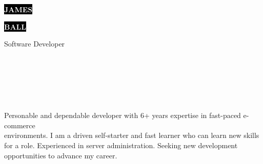 \documentclass[9pt]{cv}
\begin{document}

\begin{minipage}[t]{0.45\textwidth}
	\vspace{-\baselineskip}

	\colorbox{black}{{\HUGE\textcolor{white}{\textbf{\MakeUppercase{James}}}}}
	
	\colorbox{black}{{\HUGE\textcolor{white}{\textbf{\MakeUppercase{Ball}}}}}
	
	\vspace{6pt}
	
	{\huge Software Developer}
\end{minipage}
\begin{minipage}[t]{0.275\textwidth}
	\vspace{-\baselineskip}

	\\


	\\

\end{minipage}
\begin{minipage}[t]{0.275\textwidth}
	\vspace{-\baselineskip}

	\\

	\\
\end{minipage}

\vspace{0.5cm}



\begin{minipage}[t]{0.4\textwidth}
	\vspace{-\baselineskip}
	
	Personable and dependable developer with 6+ years expertise in fast-paced e-commerce\\
	environments. I am a driven self-starter and fast learner who can learn new skills for a role. Experienced in server administration. Seeking new development opportunities to advance my career.
\end{minipage}
\hfill
\begin{minipage}[t]{0.5\textwidth}
	\vspace{-\baselineskip}
	\begin{barchart}{5.5}
	\end{barchart}
\end{minipage}
\end{document}
